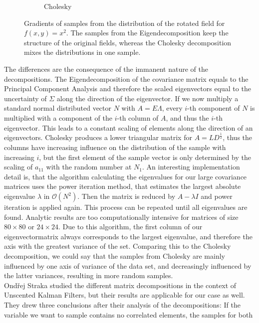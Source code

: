 \begin{figure}
\begin{subfigure}[b]{0.49\textwidth}
        \caption{Cholesky}
        \label{fig:sampleChol}
    \end{subfigure}
    \caption{Gradients of samples from the distribution of the rotated
    field for $f(x,y)=x^2$. The samples from the Eigendecomposition
    keep the structure of the original fields, whereas the Cholesky
    decomposition mixes the distributions in one sample.}
    \label{fig:MDsampComp}
\end{figure}
\indent The differences are the consequence of the immanent nature of the
decompositions. The Eigendecomposition of the covariance matrix
equals to the Principal Component Analysis and therefore the scaled
eigenvectors equal to the uncertainty of $\Sigma$ along
the direction of the eigenvector. If we now multiply a standard normal
distributed vector $N$ with $A = E\Lambda$, every $i$-th component of
$N$ is multiplied with a component of the $i$-th column of $A$, and thus
the $i$-th eigenvector. This leads to a constant scaling of elements
along the direction of an eigenvectors. Cholesky produces a lower
triangular matrix for $A=LD^{\frac{1}{2}}$, thus the columns have
increasing influence on the distribution of the sample with increasing
$i$, but the first element of the sample vector is only determined by
the scaling of $a_{11}$ with the random number at $N_1$. An interesting
implementation detail is, that the algorithm calculating the eigenvalues
for our large covariance matrices uses the power iteration method, that
estimates the largest absolute eigenvalue $\lambda$ in $\mathcal{O}
(N^2)$. Then the matrix is reduced by $A-\lambda I$ and power iteration
is applied again. This process can be repeated until all eigenvalues are
found. Analytic results are too computationally intensive for matrices
of size $80 \times 80$ or $24 \times 24$. Due to this algorithm, the
first column of our eigenvectormatrix always corresponds to the largest
eigenvalue, and therefore the axis with the greatest variance of the
set. Comparing this to the Cholesky decomposition, we could say that the
samples from Cholesky are mainly influenced by one axis of variance of
the data set, and decreasingly influenced by the latter variances,
resulting in more random samples.\\
\indent Ond\v{r}ej Straka  studied the different matrix
decompositions in the context of Unscented Kalman Filters, but their
results are applicable for our case as well. They drew three conclusions
after their analysis of the decompositions: If the variable we want to
sample contains no correlated elements, the samples for both
